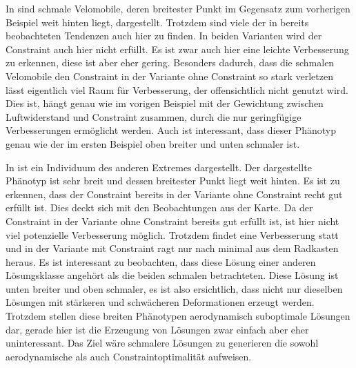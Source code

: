 In  sind schmale Velomobile, deren breitester Punkt im Gegensatz zum vorherigen Beispiel weit hinten liegt, dargestellt.
Trotzdem sind viele der in  bereits beobachteten Tendenzen auch hier zu finden.
In beiden Varianten wird der Constraint auch hier nicht erfüllt.
Es ist zwar auch hier eine leichte Verbesserung zu erkennen, diese ist aber eher gering.
Besonders dadurch, dass die schmalen Velomobile den Constraint in der Variante ohne Constraint so stark verletzen lässt eigentlich viel Raum für Verbesserung, der offensichtlich nicht genutzt wird.
Dies ist, hängt genau wie im vorigen Beispiel mit der Gewichtung zwischen Luftwiderstand und Constraint zusammen, durch die nur geringfügige Verbesserungen ermöglicht werden.
Auch ist interessant, dass dieser Phänotyp genau wie der im ersten Beispiel oben breiter und unten schmaler ist.




In  ist ein Individuum des anderen Extremes dargestellt.
Der dargestellte Phänotyp ist sehr breit und dessen breitester Punkt liegt weit hinten.
Es ist zu erkennen, dass der Constraint bereits in der Variante ohne Constraint recht gut erfüllt ist.
Dies deckt sich mit den Beobachtungen aus der Karte.
Da der Constraint in der Variante ohne Constraint bereits gut erfüllt ist, ist hier nicht viel potenzielle Verbesserung möglich.
Trotzdem findet eine Verbesserung statt und in der Variante mit Constraint ragt nur nach minimal aus dem Radkasten heraus.
Es ist interessant zu beobachten, dass diese Lösung einer anderen Lösungsklasse angehört als die beiden schmalen betrachteten.
Diese Lösung ist unten breiter und oben schmaler, es ist also ersichtlich, dass nicht nur dieselben Lösungen mit stärkeren und schwächeren Deformationen erzeugt werden.
Trotzdem stellen diese breiten Phänotypen aerodynamisch suboptimale Lösungen dar, gerade hier ist die Erzeugung von Lösungen zwar einfach aber eher uninteressant.
Das Ziel wäre schmalere Lösungen zu generieren die sowohl aerodynamische als auch Constraintoptimalität aufweisen.


